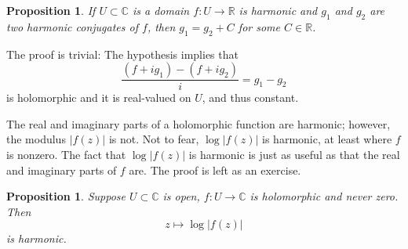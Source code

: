 \documentclass[12pt,openany]{book}
\newcommand{\sabs}[1]{\lvert {#1} \rvert}
\newcommand{\C}{{\mathbb{C}}}
\newcommand{\R}{{\mathbb{R}}}
\theoremstyle{plain}
\newtheorem{prop}[thm]{Proposition}
\theoremstyle{remark}
\theoremstyle{definition}
\theoremstyle{exercise}
\theoremstyle{example}
\begin{document}
\begin{prop} \label{prop:harmonicconjdifferbyconst}
If $U \subset \C$ is a domain $f \colon U \to \R$ is harmonic
and $g_1$ and $g_2$ are two harmonic conjugates of $f$,
then $g_1 = g_2 + C$ for some $C \in \R$.
\end{prop}

The proof is trivial: The hypothesis implies that
\begin{equation*}
\frac{(f + i g_1) - (f + i g_2)}{i} =  g_1-g_2
\end{equation*}
is holomorphic and it is real-valued on $U$, and thus constant.

The real and imaginary parts of a holomorphic function are harmonic;
however, the modulus $\sabs{f(z)}$ is not.  Not to fear,
$\log \sabs{f(z)}$ is harmonic, at least where $f$ is nonzero.
The fact that $\log \sabs{f(z)}$ is harmonic is just as useful
as that the real and imaginary parts of $f$ are.  The proof is left
as an exercise.

\begin{prop} \label{prop:logharm}
Suppose $U \subset \C$ is open, $f \colon U \to \C$ is holomorphic
and never zero.  Then
\begin{equation*}
z \mapsto \log \sabs{f(z)}
\end{equation*}
is harmonic.
\end{prop}
\end{document}
